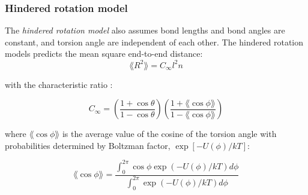 \subsubsection{Hindered rotation model}

The \textit {hindered rotation model} also assumes bond lengths and bond angles are constant, and torsion angle are independent of each other. 
The hindered rotation models predicts the mean square end-to-end distance:
\begin{equation}
\lang R^2 \rang = C_\infty l^2 n
\end{equation}

with the characteristic ratio :

\begin{equation}
C_\infty = \left(\frac{1+\cos \theta}{1-\cos \theta} \right) \left(\frac{1+\lang\cos\phi\rang}{1-\lang\cos\phi\rang}\right)
\end{equation}

where $\lang \cos \phi\rang $ is the average value of the cosine of the torsion angle with probabilities determined by Boltzman factor, $\exp[-U(\phi)/kT]$:

\begin{equation}
\lang \cos\phi\rang = \frac{\int^{2\pi}_0 \cos\phi \exp(-U(\phi)/kT)d\phi}{\int^{2\pi}_0 \exp(-U(\phi)/kT)d\phi}
\end{equation}






